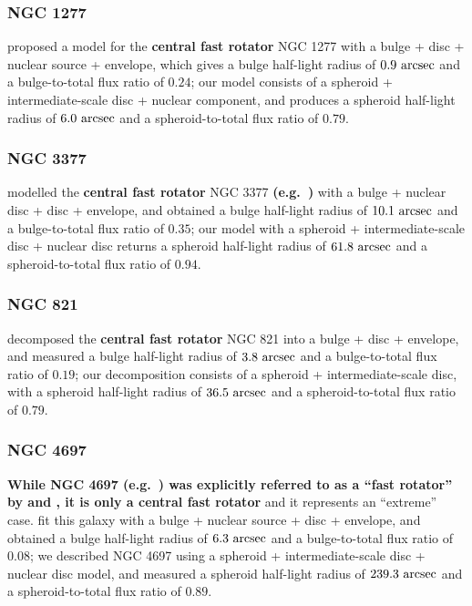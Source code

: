 \documentclass[useAMS,usenatbib,article]{mnras}
\begin{document}
\subsubsection{NGC 1277}
\cite{vandenbosch2012} proposed a model for the {\bf central fast rotator} NGC 1277 with a bulge + disc + nuclear source + envelope, 
which gives a bulge half-light radius of $0.9~\rm arcsec$ and a bulge-to-total flux ratio of $0.24$; 
our model consists of a spheroid + intermediate-scale disc + nuclear component, 
and produces a spheroid half-light radius of $6.0~\rm arcsec$ and a spheroid-to-total flux ratio of $0.79$. 

\subsubsection{NGC 3377}
\cite{lasker2014data} modelled the {\bf central fast rotator} NGC 3377 
{\bf (e.g.~\citealt{jedrzejewski1987inproceedings,scorzabender1995}) }
with a bulge + nuclear disc + disc + envelope, 
and obtained a bulge half-light radius of $10.1~\rm arcsec$ and a bulge-to-total flux ratio of $0.35$; 
our model with a spheroid + intermediate-scale disc + nuclear disc 
returns a spheroid half-light radius of $61.8~\rm arcsec$ and a spheroid-to-total flux ratio of $0.94$. 

\subsubsection{NGC 821}
\cite{lasker2014data} decomposed the {\bf central fast rotator} NGC 821 into a bulge + disc + envelope, 
and measured a bulge half-light radius of $3.8~\rm arcsec$ and a bulge-to-total flux ratio of $0.19$; 
our decomposition consists of a spheroid + intermediate-scale disc, 
with a spheroid half-light radius of $36.5~\rm arcsec$ and a spheroid-to-total flux ratio of $0.79$. 

\subsubsection{NGC 4697}
{\bf While NGC 4697 (e.g.~\citealt{carter1987,Jedrzejewski1987n720n1052n4697,davies1981}) 
was explicitly referred to as a ``fast rotator'' by \cite{capaccioli1987} and \cite{petrou1981}, 
it is only a central fast rotator} and it represents an ``extreme'' case. 
\cite{lasker2014data} fit this galaxy with a bulge + nuclear source + disc + envelope, 
and obtained a bulge half-light radius of $6.3~\rm arcsec$ and a bulge-to-total flux ratio of $0.08$; 
we described NGC 4697 using a spheroid + intermediate-scale disc + nuclear disc model, 
and measured a spheroid half-light radius of $239.3~\rm arcsec$ and a spheroid-to-total flux ratio of $0.89$. \\
\end{document}

